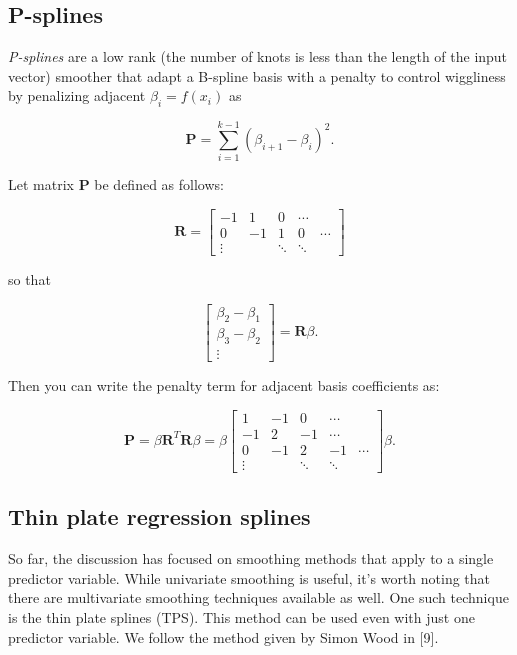 \documentclass[
11pt, %
oneside, %
english, %
singlespacing, %
]{macthesis} %
\begin{document}
\subsection{P-splines}\label{P-splines}

\emph{P-splines} are a low rank (the number of knots is less than the length of the input vector) smoother that adapt a B-spline basis with a penalty to control wiggliness by penalizing adjacent \(\beta_i = f(x_i)\) as

\[
\mathbf{P} = \sum^{k-1}_{i=1}(\beta_{i+1}-\beta_i)^2.
\]

Let matrix \(\mathbf{P}\) be defined as follows:

\[
\mathbf{R} = \begin{bmatrix}
-1 & 1 & 0 & \cdots \\
0 & -1 & 1 & 0 & \cdots \\
\vdots & & \ddots & \ddots
\end{bmatrix}
\]

so that

\[
\begin{bmatrix}
\beta_2 - \beta_1 \\
\beta_3 - \beta_2 \\
\vdots
\end{bmatrix}
= \mathbf{R} \beta.
\]

Then you can write the penalty term for adjacent basis coefficients as:

\[
\mathbf{P} = \beta \mathbf{R}^T \mathbf{R} \beta = \beta
\begin{bmatrix}
1 & -1 & 0 & \cdots \\
-1 & 2 & -1 & \cdots \\
0 & -1 & 2 & -1 & \cdots \\
\vdots & & \ddots & \ddots
\end{bmatrix}
\beta.
\]

\subsection{Thin plate regression splines}\label{Thin-plate-regression-splines}

So far, the discussion has focused on smoothing methods that apply to a single predictor variable. While univariate smoothing is useful, it's worth noting that there are multivariate smoothing techniques available as well. One such technique is the thin plate splines (TPS). This method can be used even with just one predictor variable. We follow the method given by Simon Wood in {[}9{]}.
\end{document}
